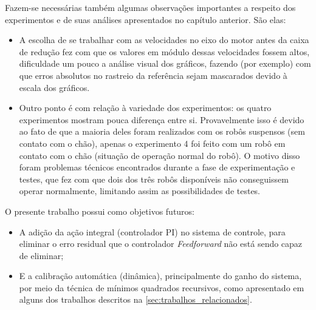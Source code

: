 Fazem-se necessárias também algumas observações importantes a respeito dos experimentos e de suas análises apresentados no capítulo anterior. São elas: 

\begin{itemize}
    \item A escolha de se trabalhar com as velocidades no eixo do motor antes da caixa de redução fez com que os valores em módulo dessas velocidades fossem altos, dificuldade um pouco a análise visual dos gráficos, fazendo (por exemplo) com que erros absolutos no rastreio da referência sejam mascarados devido à escala dos gráficos.
    
    \item Outro ponto é com relação à variedade dos experimentos: os quatro experimentos mostram pouca diferença entre si. Provavelmente isso é devido ao fato de que a maioria deles foram realizados com os robôs suspensos (sem contato com o chão), apenas o experimento 4 foi feito com um robô em contato com o chão (situação de operação normal do robô). O motivo disso foram problemas técnicos encontrados durante a fase de experimentação e testes, que fez com que dois dos três robôs disponíveis não conseguissem operar normalmente, limitando assim as possibilidades de testes.\\
\end{itemize}


O presente trabalho possui como objetivos futuros: 

\begin{itemize}
    \item A adição da ação integral (controlador PI) no sistema de controle, para eliminar o erro residual que o controlador \emph{Feedforward} não está sendo capaz de eliminar;
    
    \item E a calibração automática (dinâmica), principalmente do ganho do sistema, por meio da técnica de mínimos quadrados recursivos, como apresentado em alguns dos trabalhos descritos na \autoref{sec:trabalhos_relacionados}.
\end{itemize}

 

